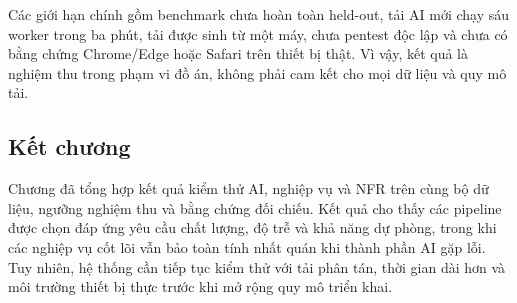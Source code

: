 Các giới hạn chính gồm benchmark chưa hoàn toàn held-out, tải AI mới chạy sáu worker trong ba phút, tải được sinh từ một máy, chưa pentest độc lập và chưa có bằng chứng Chrome/Edge hoặc Safari trên thiết bị thật. Vì vậy, kết quả là nghiệm thu trong phạm vi đồ án, không phải cam kết cho mọi dữ liệu và quy mô tải.

\subsection*{Kết chương}

Chương đã tổng hợp kết quả kiểm thử AI, nghiệp vụ và NFR trên cùng bộ dữ liệu,
ngưỡng nghiệm thu và bằng chứng đối chiếu. Kết quả cho thấy các pipeline được
chọn đáp ứng yêu cầu chất lượng, độ trễ và khả năng dự phòng, trong khi các
nghiệp vụ cốt lõi vẫn bảo toàn tính nhất quán khi thành phần AI gặp lỗi. Tuy
nhiên, hệ thống cần tiếp tục kiểm thử với tải phân tán, thời gian dài hơn và
môi trường thiết bị thực trước khi mở rộng quy mô triển khai.
